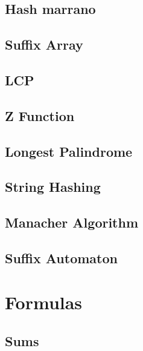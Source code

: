 \documentclass[10pt]{article}
\begin{document}
\begin{multicols*}{2}
\subsection{Hash marrano}


\subsection{Suffix Array}


\subsection{LCP}


\subsection{Z Function}


\subsection{Longest Palindrome}


\subsection{String Hashing}


\subsection{Manacher Algorithm}


\subsection{Suffix Automaton}

\section{Formulas}

\subsection{Sums}


\end{multicols*}
\end{document}
